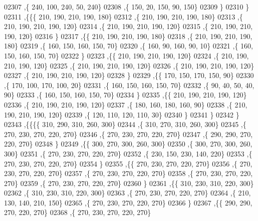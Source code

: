 \begin{DoxyCode}
02307     ,\{   240,   100,   240,    50,   240\}
02308     ,\{   150,    20,   150,    90,   150\}
02309     \}
02310    \}
02311   ,\{\{\{   210,   190,   210,   190,   180\}
02312     ,\{   210,   190,   210,   190,   180\}
02313     ,\{   210,   190,   210,   190,   120\}
02314     ,\{   210,   190,   210,   190,   120\}
02315     ,\{   210,   190,   210,   190,   120\}
02316     \}
02317    ,\{\{   210,   190,   210,   190,   180\}
02318     ,\{   210,   190,   210,   190,   180\}
02319     ,\{   160,   150,   160,   150,    70\}
02320     ,\{   160,    90,   160,    90,    10\}
02321     ,\{   160,   150,   160,   150,    70\}
02322     \}
02323    ,\{\{   210,   190,   210,   190,   120\}
02324     ,\{   210,   190,   210,   190,   120\}
02325     ,\{   210,   190,   210,   190,   120\}
02326     ,\{   210,   190,   210,   190,   120\}
02327     ,\{   210,   190,   210,   190,   120\}
02328     \}
02329    ,\{\{   170,   150,   170,   150,    90\}
02330     ,\{   170,   100,   170,   100,    20\}
02331     ,\{   160,   150,   160,   150,    70\}
02332     ,\{    90,    40,    50,    40,    90\}
02333     ,\{   160,   150,   160,   150,    70\}
02334     \}
02335    ,\{\{   210,   190,   210,   190,   120\}
02336     ,\{   210,   190,   210,   190,   120\}
02337     ,\{   180,   160,   180,   160,    90\}
02338     ,\{   210,   190,   210,   190,   120\}
02339     ,\{   120,   110,   120,   110,    30\}
02340     \}
02341    \}
02342   \}
02343  ,\{\{\{\{   310,   290,   310,   260,   300\}
02344     ,\{   310,   270,   310,   260,   300\}
02345     ,\{   270,   230,   270,   220,   270\}
02346     ,\{   270,   230,   270,   220,   270\}
02347     ,\{   290,   290,   270,   220,   270\}
02348     \}
02349    ,\{\{   300,   270,   300,   260,   300\}
02350     ,\{   300,   270,   300,   260,   300\}
02351     ,\{   270,   230,   270,   220,   270\}
02352     ,\{   230,   150,   230,   140,   220\}
02353     ,\{   270,   230,   270,   220,   270\}
02354     \}
02355    ,\{\{   270,   230,   270,   220,   270\}
02356     ,\{   270,   230,   270,   220,   270\}
02357     ,\{   270,   230,   270,   220,   270\}
02358     ,\{   270,   230,   270,   220,   270\}
02359     ,\{   270,   230,   270,   220,   270\}
02360     \}
02361    ,\{\{   310,   230,   310,   220,   300\}
02362     ,\{   310,   230,   310,   220,   300\}
02363     ,\{   270,   230,   270,   220,   270\}
02364     ,\{   210,   130,   140,   210,   150\}
02365     ,\{   270,   230,   270,   220,   270\}
02366     \}
02367    ,\{\{   290,   290,   270,   220,   270\}
02368     ,\{   270,   230,   270,   220,   270\}

\end{DoxyCode}
